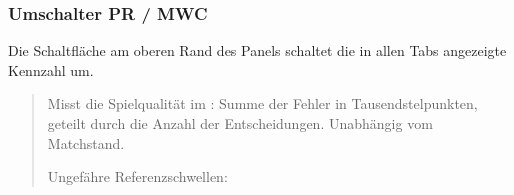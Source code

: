 \documentclass[letterpaper,10pt,german]{sphinxmanual}
\begin{document}
\subsubsection{Umschalter PR / MWC}
\label{\detokenize{manuel:toggle-pr-mwc}}
\sphinxAtStartPar
Die Schaltfläche  am oberen Rand des Panels schaltet die in allen Tabs angezeigte Kennzahl um.

\sphinxAtStartPar
{}
\begin{quote}

\sphinxAtStartPar
Misst die Spielqualität im : Summe der Fehler in Tausendstelpunkten, geteilt durch die Anzahl der Entscheidungen. Unabhängig vom Matchstand.

\sphinxAtStartPar
Ungefähre Referenzschwellen:



\end{quote}
\end{document}
